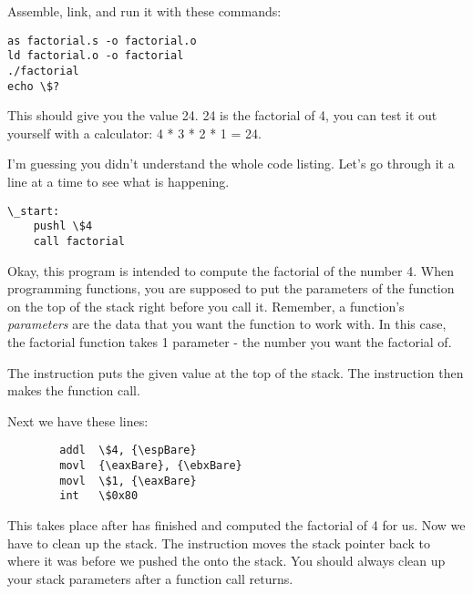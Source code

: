 \begin{simpletyping}

\end{simpletyping}

Assemble, link, and run it with these commands:

\begin{simpletyping}
\begin{lstlisting}
as factorial.s -o factorial.o
ld factorial.o -o factorial
./factorial
echo \$?
\end{lstlisting}
\end{simpletyping}

This should give you the value 24.  24 is the factorial of 4, you can
test it out yourself with a calculator: 4 * 3 * 2 * 1 = 24.

I'm guessing you didn't understand the whole code listing.  Let's go
through it a line at a time to see what is happening. 

\begin{simpletyping}
\begin{lstlisting}
\_start:
	pushl \$4
	call factorial
\end{lstlisting}
\end{simpletyping}

Okay, this program is intended to compute the factorial of the number 
4.  When programming functions, you are supposed to put the
parameters of the function on the top of the stack right before
you call it.  Remember, a function's \emph{parameters}
are the data that you want the function to work with.  In this case,
the factorial function takes 1 parameter - the number you want the
factorial of.  

The 
instruction puts the given value at the top of the stack.  
The  instruction then makes the function call.

Next we have these lines:

\begin{simpletyping}
\begin{lstlisting}
        addl  \$4, {\espBare}
        movl  {\eaxBare}, {\ebxBare}
        movl  \$1, {\eaxBare}
        int   \$0x80
\end{lstlisting}
\end{simpletyping}

This takes place after  has finished and computed
the factorial of 4 for us.  Now we have to clean up the stack.
The  instruction moves the stack pointer back
to where it was before we pushed the  onto the stack.
You should always clean up your stack parameters after a function call returns.

